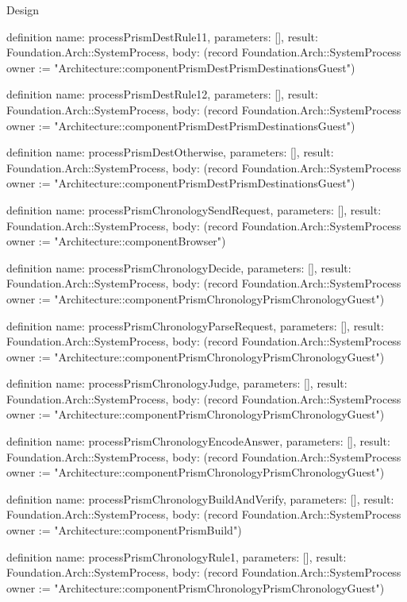 \begin{lexlean}{Design}
\begin{semanticmodule}
definition{
  name: processPrismDestRule11,
  parameters: [],
  result: Foundation.Arch::SystemProcess,
  body: (record Foundation.Arch::SystemProcess {owner := "Architecture::componentPrismDestPrismDestinationsGuest"})
}

definition{
  name: processPrismDestRule12,
  parameters: [],
  result: Foundation.Arch::SystemProcess,
  body: (record Foundation.Arch::SystemProcess {owner := "Architecture::componentPrismDestPrismDestinationsGuest"})
}

definition{
  name: processPrismDestOtherwise,
  parameters: [],
  result: Foundation.Arch::SystemProcess,
  body: (record Foundation.Arch::SystemProcess {owner := "Architecture::componentPrismDestPrismDestinationsGuest"})
}

definition{
  name: processPrismChronologySendRequest,
  parameters: [],
  result: Foundation.Arch::SystemProcess,
  body: (record Foundation.Arch::SystemProcess {owner := "Architecture::componentBrowser"})
}

definition{
  name: processPrismChronologyDecide,
  parameters: [],
  result: Foundation.Arch::SystemProcess,
  body: (record Foundation.Arch::SystemProcess {owner := "Architecture::componentPrismChronologyPrismChronologyGuest"})
}

definition{
  name: processPrismChronologyParseRequest,
  parameters: [],
  result: Foundation.Arch::SystemProcess,
  body: (record Foundation.Arch::SystemProcess {owner := "Architecture::componentPrismChronologyPrismChronologyGuest"})
}

definition{
  name: processPrismChronologyJudge,
  parameters: [],
  result: Foundation.Arch::SystemProcess,
  body: (record Foundation.Arch::SystemProcess {owner := "Architecture::componentPrismChronologyPrismChronologyGuest"})
}

definition{
  name: processPrismChronologyEncodeAnswer,
  parameters: [],
  result: Foundation.Arch::SystemProcess,
  body: (record Foundation.Arch::SystemProcess {owner := "Architecture::componentPrismChronologyPrismChronologyGuest"})
}

definition{
  name: processPrismChronologyBuildAndVerify,
  parameters: [],
  result: Foundation.Arch::SystemProcess,
  body: (record Foundation.Arch::SystemProcess {owner := "Architecture::componentPrismBuild"})
}

definition{
  name: processPrismChronologyRule1,
  parameters: [],
  result: Foundation.Arch::SystemProcess,
  body: (record Foundation.Arch::SystemProcess {owner := "Architecture::componentPrismChronologyPrismChronologyGuest"})
}


\end{semanticmodule}
\end{lexlean}
